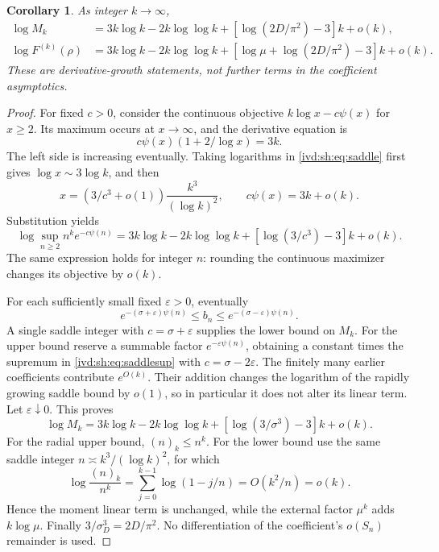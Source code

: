 \documentclass[11pt,letterpaper]{article}
\newtheorem{corollary}[theorem]{Corollary}
\theoremstyle{remark}\newtheorem{remark}[theorem]{Remark}
\numberwithin{equation}{section}
\begin{document}
\begin{corollary}\label{ivd:sh:cor:derivatives}
As integer $k\to\infty$,
\begin{align}
 \log M_k
  &=3k\log k-2k\log\log k
      +[\log(2D/\pi^2)-3]k+o(k),\label{ivd:sh:eq:boundaryderivatives}\\
 \log F^{(k)}(\rho)
  &=3k\log k-2k\log\log k
      +[\log\mu+\log(2D/\pi^2)-3]k+o(k).
 \label{ivd:sh:eq:radialderivatives}
\end{align}
These are derivative-growth statements, not further terms in the
coefficient asymptotics.
\end{corollary}
\begin{proof}
For fixed $c>0$, consider the continuous objective
$k\log x-c\psi(x)$ for $x\ge2$.
Its maximum occurs at $x\to\infty$, and the derivative equation is
\begin{equation}\label{ivd:sh:eq:saddle}
 c\psi(x)(1+2/\log x)=3k.
\end{equation}
The left side is increasing eventually. Taking logarithms in
\eqref{ivd:sh:eq:saddle} first gives $\log x\sim3\log k$, and then
\[
 x=(3/c^3+o(1))\frac{k^3}{(\log k)^2},\qquad
 c\psi(x)=3k+o(k).
\]
Substitution yields
\begin{equation}\label{ivd:sh:eq:saddlesup}
 \log\sup_{n\ge2}n^k e^{-c\psi(n)}
 =3k\log k-2k\log\log k+[\log(3/c^3)-3]k+o(k).
\end{equation}
The same expression holds for integer $n$: rounding the continuous
maximizer changes its objective by $o(k)$.

For each sufficiently small fixed $\varepsilon>0$, eventually
\[
 e^{-(\sigma+\varepsilon)\psi(n)}\le b_n
      \le e^{-(\sigma-\varepsilon)\psi(n)}.
\]
A single saddle integer with $c=\sigma+\varepsilon$ supplies the
lower bound on $M_k$. For the upper bound reserve a summable factor
$e^{-\varepsilon\psi(n)}$, obtaining a constant times the supremum
in \eqref{ivd:sh:eq:saddlesup} with $c=\sigma-2\varepsilon$.
The finitely many earlier coefficients contribute $e^{O(k)}$.
Their addition changes the logarithm of the rapidly growing saddle
bound by $o(1)$, so in particular it does not alter its linear term.
Let $\varepsilon\downarrow0$. This proves
\[
 \log M_k=3k\log k-2k\log\log k+[\log(3/\sigma^3)-3]k+o(k).
\]
For the radial upper bound, $(n)_k\le n^k$. For the lower bound
use the same saddle integer $n\asymp k^3/(\log k)^2$, for which
\[
 \log\frac{(n)_k}{n^k}
  =\sum_{j=0}^{k-1}\log(1-j/n)=O(k^2/n)=o(k).
\]
Hence the moment linear term is unchanged, while the external factor
$\mu^k$ adds $k\log\mu$. Finally $3/\sigma_D^3=2D/\pi^2$.
No differentiation of the coefficient's $o(S_n)$ remainder is used.
\end{proof}
\end{document}
